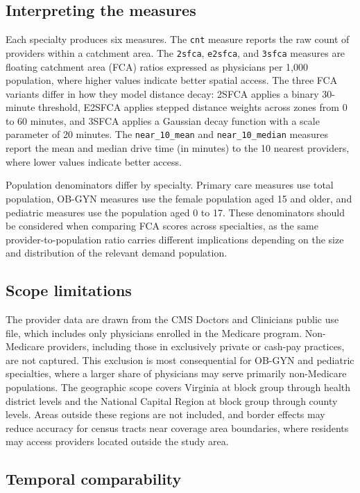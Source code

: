\documentclass{CUP-JNL-DAP}%
\begin{document}
\subsection{Interpreting the measures}

Each specialty produces six measures. The \texttt{cnt} measure reports the raw count of providers within a catchment area. The \texttt{2sfca}, \texttt{e2sfca}, and \texttt{3sfca} measures are floating catchment area (FCA) ratios expressed as physicians per 1{,}000 population, where higher values indicate better spatial access. The three FCA variants differ in how they model distance decay: 2SFCA applies a binary 30-minute threshold, E2SFCA applies stepped distance weights across zones from 0 to 60 minutes, and 3SFCA applies a Gaussian decay function with a scale parameter of 20 minutes. The \texttt{near\_10\_mean} and \texttt{near\_10\_median} measures report the mean and median drive time (in minutes) to the 10 nearest providers, where lower values indicate better access.

Population denominators differ by specialty. Primary care measures use total population, OB-GYN measures use the female population aged 15 and older, and pediatric measures use the population aged 0 to 17. These denominators should be considered when comparing FCA scores across specialties, as the same provider-to-population ratio carries different implications depending on the size and distribution of the relevant demand population.

\subsection{Scope limitations}

The provider data are drawn from the CMS Doctors and Clinicians public use file, which includes only physicians enrolled in the Medicare program. Non-Medicare providers, including those in exclusively private or cash-pay practices, are not captured. This exclusion is most consequential for OB-GYN and pediatric specialties, where a larger share of physicians may serve primarily non-Medicare populations. The geographic scope covers Virginia at block group through health district levels and the National Capital Region at block group through county levels. Areas outside these regions are not included, and border effects may reduce accuracy for census tracts near coverage area boundaries, where residents may access providers located outside the study area.

\subsection{Temporal comparability}
\end{document}
